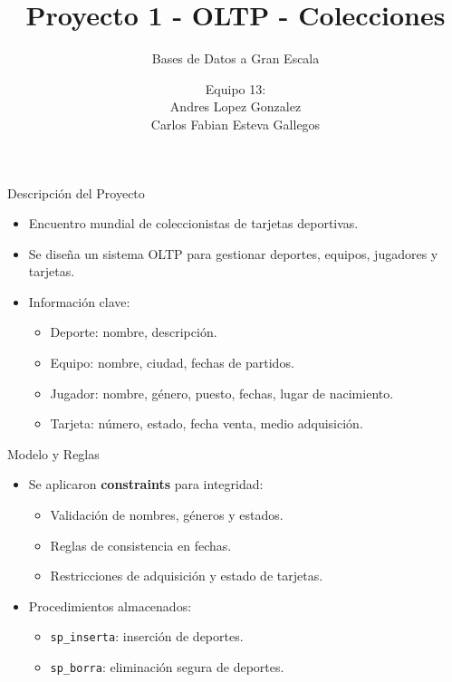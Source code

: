 \documentclass{beamer}
\title{Proyecto 1 - OLTP - Colecciones}
\subtitle{Bases de Datos a Gran Escala}
\author{Equipo 13: \\ Andres Lopez Gonzalez \\ Carlos Fabian Esteva Gallegos}
\date{}
\begin{document}
\begin{frame}
  \titlepage
\end{frame}

\begin{frame}{Descripción del Proyecto}
  \begin{itemize}
    \item Encuentro mundial de coleccionistas de tarjetas deportivas.
    \item Se diseña un sistema OLTP para gestionar deportes, equipos, jugadores y tarjetas.
    \item Información clave:
    \begin{itemize}
      \item Deporte: nombre, descripción.
      \item Equipo: nombre, ciudad, fechas de partidos.
      \item Jugador: nombre, género, puesto, fechas, lugar de nacimiento.
      \item Tarjeta: número, estado, fecha venta, medio adquisición.
    \end{itemize}
  \end{itemize}
\end{frame}

\begin{frame}{Modelo y Reglas}
  \begin{itemize}
    \item Se aplicaron \textbf{constraints} para integridad:
    \begin{itemize}
      \item Validación de nombres, géneros y estados.
      \item Reglas de consistencia en fechas.
      \item Restricciones de adquisición y estado de tarjetas.
    \end{itemize}
    \item Procedimientos almacenados:
    \begin{itemize}
      \item \texttt{sp\_inserta}: inserción de deportes.
      \item \texttt{sp\_borra}: eliminación segura de deportes.
    \end{itemize}
  \end{itemize}
\end{frame}
\end{document}
